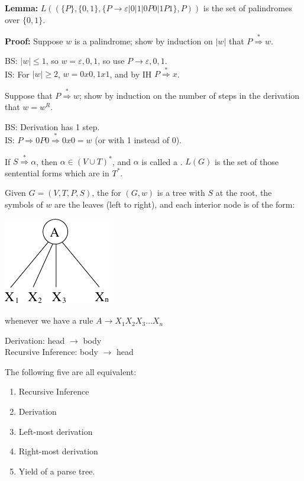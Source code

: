 \begin{frame}

{\bf Lemma:}
$L((\{P\},\{0,1\},\{P\longrightarrow\varepsilon|0|1|0P0|1P1\},P))$ is
the set of palindromes over $\{0,1\}$.

{\bf Proof:} Suppose $w$ is a palindrome; show by induction on $|w|$
that $P\stackrel{*}{\Rightarrow}w$.

BS: $|w|\le 1$, so $w=\varepsilon,0,1$, so use
$P\longrightarrow\varepsilon,0,1$.  \\
IS: For $|w|\ge 2$, $w=0x0,1x1$, and
by IH $P\stackrel{*}{\Rightarrow}x$.

Suppose that $P\stackrel{*}{\Rightarrow}w$; show by induction on the
number of steps in the derivation that $w=w^R$.

BS: Derivation has 1 step. \\ 
IS: $P\Rightarrow 0P0\stackrel{*}{\Rightarrow}0x0=w$ (or with 1 instead of 0).
\end{frame}

\begin{frame}

If $S\stackrel{*}{\Rightarrow}\alpha$, then $\alpha\in (V\cup T)^*$,
and $\alpha$ is called a .  
$L(G)$ is the set of those
sentential forms which are in $T^*$.

Given $G=(V,T,P,S)$, the  for $(G,w)$ is a tree with
$S$ at the root, the symbols of $w$ are the leaves (left to right),
and each interior node is of the form:
\begin{center}
\includegraphics{figures/8.pdf}
\end{center}
whenever we have a rule $A\longrightarrow X_1X_2X_3\ldots X_n$
\end{frame}

\begin{frame}
Derivation: head $\longrightarrow$ body \\
Recursive Inference: body $\longrightarrow$ head

The following five are all equivalent:
\begin{enumerate}
\item  Recursive Inference
\item  Derivation
\item  Left-most derivation
\item  Right-most derivation
\item  Yield of a parse tree.
\end{enumerate}
\end{frame}

